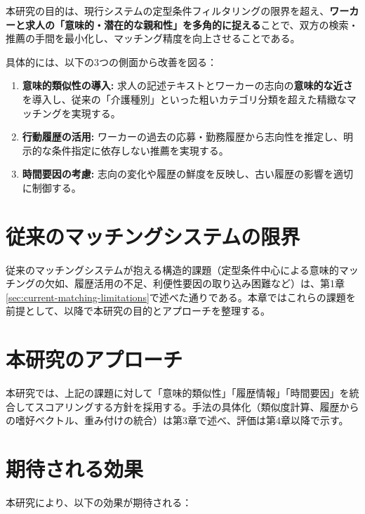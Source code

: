 本研究の目的は、現行システムの定型条件フィルタリングの限界を超え、\textbf{ワーカーと求人の「意味的・潜在的な親和性」を多角的に捉える}ことで、双方の検索・推薦の手間を最小化し、マッチング精度を向上させることである。

具体的には、以下の3つの側面から改善を図る：

\begin{enumerate}
\item \textbf{意味的類似性の導入:} 求人の記述テキストとワーカーの志向の\textbf{意味的な近さ}を導入し、従来の「介護種別」といった粗いカテゴリ分類を超えた精緻なマッチングを実現する。

\item \textbf{行動履歴の活用:} ワーカーの過去の応募・勤務履歴から志向性を推定し、明示的な条件指定に依存しない推薦を実現する。

\item \textbf{時間要因の考慮:} 志向の変化や履歴の鮮度を反映し、古い履歴の影響を適切に制御する。

\end{enumerate}

\section{従来のマッチングシステムの限界}
従来のマッチングシステムが抱える構造的課題（定型条件中心による意味的マッチングの欠如、履歴活用の不足、利便性要因の取り込み困難など）は、第1章\ref{sec:current-matching-limitations}で述べた通りである。本章ではこれらの課題を前提として、以降で本研究の目的とアプローチを整理する。

\section{本研究のアプローチ}
本研究では、上記の課題に対して「意味的類似性」「履歴情報」「時間要因」を統合してスコアリングする方針を採用する。手法の具体化（類似度計算、履歴からの嗜好ベクトル、重み付けの統合）は第3章で述べ、評価は第4章以降で示す。

\section{期待される効果}
本研究により、以下の効果が期待される：


